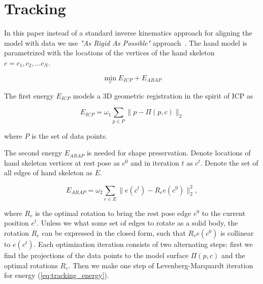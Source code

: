 \section{Tracking}

In this paper instead of a standard inverse kinematics approach for aligning the model with data we use \textit{"As Rigid As Possible"} approach~\cite{sorkine2007arap}. The hand model is parametrized with the locations of the vertices of the hand skeleton $c = {c_1, c_2, ... c_N}$.

\begin{equation}
	\min_{c} E_{ICP} + E_{ARAP} \label{eq:tracking_energy}
\end{equation}

The first energy $E_{ICP}$ models a 3D geometric registration in the spirit of ICP as

\begin{equation}
	E_{ICP} = \omega_1 \sum_{p \in P} \| p - \Pi(p, c)\|_2
\end{equation}

where $P$ is the set of data points.

The second energy $E_{ARAP}$ is needed for shape preservation. Denote locations of hand skeleton vertices at rest pose as $c^0$ and in iteration $t$ as $c^t$. Denote the set of all edges of hand skeleton as $E$.

\begin{equation}
	E_{ARAP} = \omega_2 \sum_{e \in E} \| e(c^t) - R_e e(c^0)\|_2^2,
\end{equation}

where $R_e$ is the optimal rotation to bring the rest pose edge $e^0$ to the current position $e^t$. Unless we what some set of edges to rotate as a solid body, the rotation $R_e$ can be expressed in the closed form, such that $R_e e(c^0)$ is collinear to $e(c^t)$. 
Each optimization iteration consists of two alternating steps: first we find the projections of the data points to the model surface $\Pi(p, c)$ and the optimal rotations $  R_e  $. Then we make one step of Levenberg-Marquardt iteration for energy (\ref{eq:tracking_energy}).